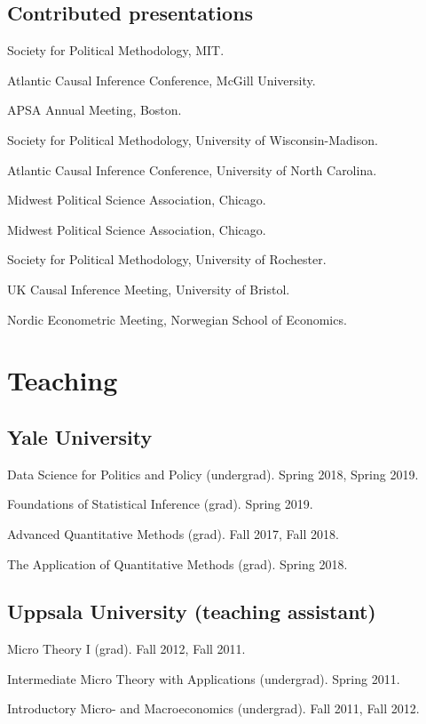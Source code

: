 \documentclass[10pt,letterpaper]{article}
\newenvironment{singledatelist}{
	\begin{list}{}{
		\setlength{\parskip}{0pt}
		\setlength{\itemsep}{4pt}
		\setlength{\parsep}{0.3em}
		\setlength{\leftmargin}{3.5em}
		\setlength{\labelwidth}{3.5em}
		\setlength{\labelsep}{1.5em}
		}
	}{
\end{list}
}
\newcommand{\dateitem}[2][]{\item[{#1}] {#2}}
\newenvironment{infolist}{
	\begin{list}{}{
		\setlength{\parskip}{0pt}
		\setlength{\itemsep}{4pt}
		\setlength{\parsep}{0.3em}
		\setlength{\leftmargin}{0em}
		\setlength{\labelwidth}{0em}
		}
	}{
\end{list}
}
\newcommand{\infoitem}[1]{\item {#1}}
\begin{document}
	\subsection*{Contributed presentations}

	\begin{singledatelist}
		\dateitem[2019]{Society for Political Methodology, MIT.}
		\dateitem{Atlantic Causal Inference Conference, McGill University.}
		\dateitem[2018]{APSA Annual Meeting, Boston.}
		\dateitem[2017]{Society for Political Methodology, University of Wisconsin-Madison.}
		\dateitem{Atlantic Causal Inference Conference, University of North Carolina.}
		\dateitem{Midwest Political Science Association, Chicago.}
		\dateitem[2016]{Midwest Political Science Association, Chicago.}
		\dateitem[2015]{Society for Political Methodology, University of Rochester.}
		\dateitem{UK Causal Inference Meeting, University of Bristol.}
		\dateitem[2013]{Nordic Econometric Meeting, Norwegian School of Economics.}
	\end{singledatelist}


	\section*{Teaching}

	\subsection*{Yale University}

	\begin{infolist}
		\infoitem{Data Science for Politics and Policy (undergrad). Spring 2018, Spring 2019.}
		\infoitem{Foundations of Statistical Inference (grad). Spring 2019.}
		\infoitem{Advanced Quantitative Methods (grad). Fall 2017, Fall 2018.}
		\infoitem{The Application of Quantitative Methods (grad). Spring 2018.}
	\end{infolist}

	\subsection*{Uppsala University (teaching assistant)}

	\begin{infolist}
		\infoitem{Micro Theory I (grad). Fall 2012, Fall 2011.}
		\infoitem{Intermediate Micro Theory with Applications (undergrad). Spring 2011.}
		\infoitem{Introductory Micro- and Macroeconomics (undergrad). Fall 2011, Fall 2012.}
	\end{infolist}
\end{document}
